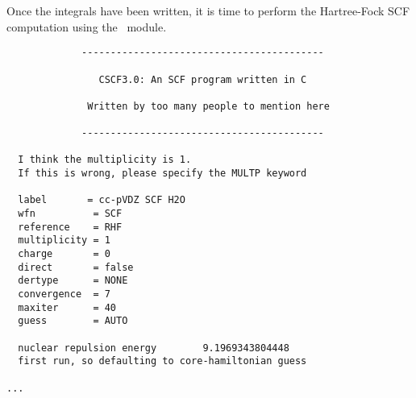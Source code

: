 Once the integrals have been written, it is time to perform the 
Hartree-Fock SCF computation using the \PSIcscf\ module.  
\begin{verbatim}
             ------------------------------------------
                                                                                
                CSCF3.0: An SCF program written in C
                                                                                
              Written by too many people to mention here
                                                                                
             ------------------------------------------
                                                                                
  I think the multiplicity is 1.
  If this is wrong, please specify the MULTP keyword
                                                                                
  label       = cc-pVDZ SCF H2O
  wfn          = SCF
  reference    = RHF
  multiplicity = 1
  charge       = 0
  direct       = false
  dertype      = NONE
  convergence  = 7
  maxiter      = 40
  guess        = AUTO
                                                                                
  nuclear repulsion energy        9.1969343804448
  first run, so defaulting to core-hamiltonian guess

...
\end{verbatim}

